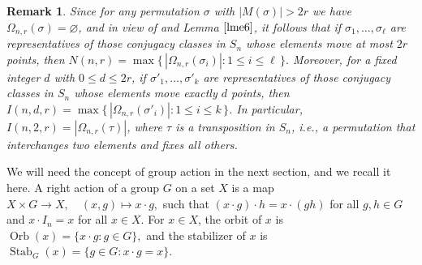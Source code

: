 \documentclass{amsart}
\newtheorem{rem}[thm]{Remark}
\numberwithin{equation}{section}
\begin{document}
\begin{rem}\label{rem}
Since for any permutation $\sigma$ with $|M(\sigma)| > 2r$ we have $\Omega_{n,r}(\sigma) = \varnothing$, and in view of \cite[Lemma 3]{WFK} and Lemma $\ref{lme6} $, it follows that if $\sigma_1,\dots,\sigma_\ell$ are representatives of those conjugacy classes in $S_n$ whose elements move at most $2r$ points, then 
$
N(n,r) = \max \bigl\{\, |\Omega_{n,r}(\sigma_i)| : 1 \leq i \leq \ell \,\bigr\}.
$ Moreover, for a fixed integer $d$ with $0 \leq d \leq 2r$, if $\sigma'_1,\dots,\sigma'_k$ are representatives of those conjugacy classes in $S_n$ whose elements move exactly $d$ points, then
$
I(n,d,r) = \max \bigl\{\, |\Omega_{n,r}(\sigma'_i)| : 1 \leq i \leq k \,\bigr\}$. In particular, $I(n,2,r) = |\Omega_{n,r}(\tau)|$, where $\tau$ is a transposition in $S_n$, i.e., a permutation that interchanges two elements and fixes all others.
\end{rem}
We will need the concept of group action in the next section, and we recall it here. 
A right action of a group $G$ on a set $X$ is a map
$
X \times G \to X, \quad (x,g) \mapsto x \cdot g,
$
such that $(x \cdot g)\cdot h = x \cdot (gh)$ for all $g,h \in G$ and $x \cdot I_n = x$ for all $x \in X$. 
For $x \in X$, the orbit of $x$ is
$
\operatorname{Orb}(x) = \{x \cdot g : g \in G\},
$
and the  stabilizer of $x$ is
$
\operatorname{Stab}_G(x) = \{g \in G : x \cdot g = x\}.
$
\end{document}
